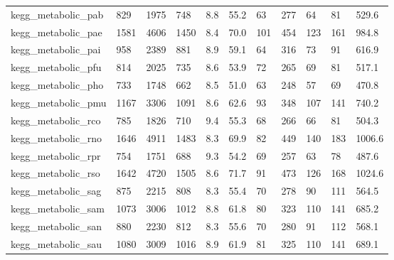\begin{longtable}{lllllllllll}
 kegg\_metabolic\_pab                                 & 829        & 1975      & 748   & 8.8    & 55.2   & 63    & 277    & 64     & 81     & 529.6   \\
 kegg\_metabolic\_pae                                 & 1581       & 4606      & 1450  & 8.4    & 70.0   & 101   & 454    & 123    & 161    & 984.8   \\
 kegg\_metabolic\_pai                                 & 958        & 2389      & 881   & 8.9    & 59.1   & 64    & 316    & 73     & 91     & 616.9   \\
 kegg\_metabolic\_pfu                                 & 814        & 2025      & 735   & 8.6    & 53.9   & 72    & 265    & 69     & 81     & 517.1   \\
 kegg\_metabolic\_pho                                 & 733        & 1748      & 662   & 8.5    & 51.0   & 63    & 248    & 57     & 69     & 470.8   \\
 kegg\_metabolic\_pmu                                 & 1167       & 3306      & 1091  & 8.6    & 62.6   & 93    & 348    & 107    & 141    & 740.2   \\
 kegg\_metabolic\_rco                                 & 785        & 1826      & 710   & 9.4    & 55.3   & 68    & 266    & 66     & 81     & 504.3   \\
 kegg\_metabolic\_rno                                 & 1646       & 4911      & 1483  & 8.3    & 69.9   & 82    & 449    & 140    & 183    & 1006.6  \\
 kegg\_metabolic\_rpr                                 & 754        & 1751      & 688   & 9.3    & 54.2   & 69    & 257    & 63     & 78     & 487.6   \\
 kegg\_metabolic\_rso                                 & 1642       & 4720      & 1505  & 8.6    & 71.7   & 91    & 473    & 126    & 168    & 1024.6  \\
 kegg\_metabolic\_sag                                 & 875        & 2215      & 808   & 8.3    & 55.4   & 70    & 278    & 90     & 111    & 564.5   \\
 kegg\_metabolic\_sam                                 & 1073       & 3006      & 1012  & 8.8    & 61.8   & 80    & 323    & 110    & 141    & 685.2   \\
 kegg\_metabolic\_san                                 & 880        & 2230      & 812   & 8.3    & 55.6   & 70    & 280    & 91     & 112    & 568.1   \\
 kegg\_metabolic\_sau                                 & 1080       & 3009      & 1016  & 8.9    & 61.9   & 81    & 325    & 110    & 141    & 689.1   \\

\end{longtable}
